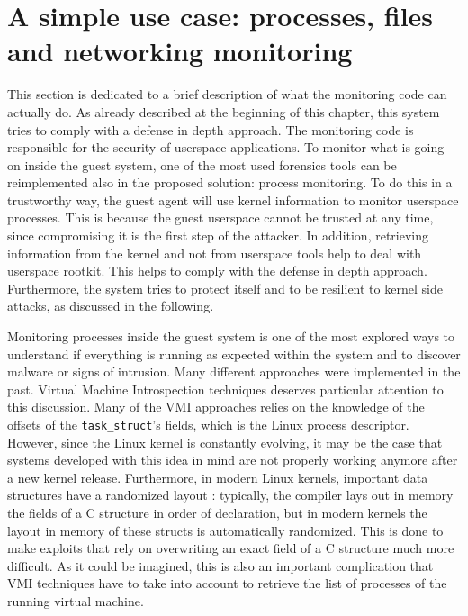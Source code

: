 \section{A simple use case: processes, files and networking monitoring}
This section is dedicated to a brief description of what the monitoring code can actually do. As already described at the beginning of this chapter, this system tries to comply with a defense in depth approach. The monitoring code is responsible for the security of userspace applications. To monitor what is going on inside the guest system, one of the most used forensics tools can be reimplemented also in the proposed solution: process monitoring. To do this in a trustworthy way, the guest agent will use kernel information to monitor userspace processes. This is because the guest userspace cannot be trusted at any time, since compromising it is the first step of the attacker. In addition, retrieving information from the kernel and not from userspace tools help to deal with userspace rootkit. This helps to comply with the defense in depth approach. Furthermore, the system tries to protect itself and to be resilient to kernel side attacks, as discussed in the following.
\par 
Monitoring processes inside the guest system is one of the most explored ways to understand if everything is running as expected within the system and to discover malware or signs of intrusion. Many different approaches were implemented in the past. Virtual Machine Introspection techniques deserves particular attention to this discussion. Many of the VMI approaches relies on the knowledge of the offsets of the \texttt{task\_struct}'s fields, which is the Linux process descriptor. However, since the Linux kernel is constantly evolving, it may be the case that systems developed with this idea in mind are not properly working anymore after a new kernel release. Furthermore, in modern Linux kernels, important data structures have a randomized layout \cite{struct-layout-rand}: typically, the compiler lays out in memory the fields of a C structure in order of declaration, but in modern kernels the layout in memory of these structs is automatically randomized. This is done to make exploits that rely on overwriting an exact field of a C structure much more difficult. As it could be imagined, this is also an important complication that VMI techniques have to take into account to retrieve the list of processes of the running virtual machine.

